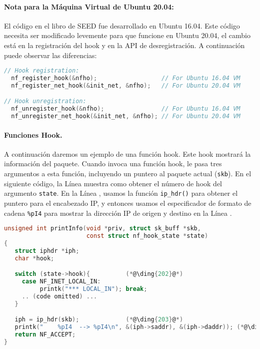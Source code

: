 \paragraph{Nota para la Máquina Virtual de Ubuntu 20.04:}
El código en el libro de SEED fue desarrollado en Ubuntu 16.04. Este código necesita ser modificado levemente para que funcione en Ubuntu 20.04, el cambio está en la registración del hook y en la API de desregistración. A continuación puede observar las diferencias:


\begin{lstlisting}[language=C]
// Hook registration:
  nf_register_hook(&nfho);                  // For Ubuntu 16.04 VM
  nf_register_net_hook(&init_net, &nfho);   // For Ubuntu 20.04 VM

// Hook unregistration:
  nf_unregister_hook(&nfho);                // For Ubuntu 16.04 VM
  nf_unregister_net_hook(&init_net, &nfho); // For Ubuntu 20.04 VM
\end{lstlisting}
 

\paragraph{Funciones Hook.} A continuación daremos un ejemplo de una función hook. Este hook mostrará la información del paquete.
Cuando \netfilter invoca una función hook, le pasa tres argumentos a esta función, incluyendo un puntero al paquete actual (\texttt{skb}). 
En el siguiente código, la Línea  muestra como obtener el número de hook del argumento \texttt{state}.
En la Línea , usamos la función \texttt{ip\_hdr()} para obtener el puntero para el encabezado IP, y entonces usamos el especificador de formato de cadena \texttt{\%pI4} para mostrar la dirección IP de origen y destino en la Línea .

\begin{lstlisting}[language=C, caption={An example of hook function}]
unsigned int printInfo(void *priv, struct sk_buff *skb,   
                       const struct nf_hook_state *state)
{
   struct iphdr *iph;
   char *hook;

   switch (state->hook){          (*@\ding{202}@*)
     case NF_INET_LOCAL_IN: 
          printk("*** LOCAL_IN"); break;
     .. (code omitted) ...
   }

   iph = ip_hdr(skb);             (*@\ding{203}@*)           
   printk("    %pI4  --> %pI4\n", &(iph->saddr), &(iph->daddr)); (*@\ding{204}@*)
   return NF_ACCEPT;
}
\end{lstlisting}

